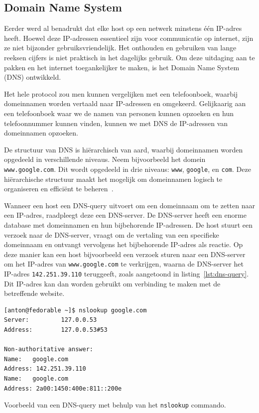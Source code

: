 \subsection{Domain Name System}
\label{netwerk_dns}

Eerder werd al benadrukt dat elke host op een netwerk minstens één IP-adres heeft.
Hoewel deze IP-adressen essentieel zijn voor communicatie op internet, zijn ze niet bijzonder gebruiksvriendelijk.
Het onthouden en gebruiken van lange reeksen cijfers is niet praktisch in het dagelijks gebruik.
Om deze uitdaging aan te pakken en het internet toegankelijker te maken, is het Domain Name System (DNS) ontwikkeld.

Het hele protocol zou men kunnen vergelijken met een telefoonboek, waarbij domeinnamen worden vertaald naar IP-adressen en omgekeerd.
Gelijkaarig aan een telefoonboek waar we de namen van personen kunnen opzoeken en hun telefoonnummer kunnen vinden, kunnen we met DNS de IP-adressen van domeinnamen opzoeken.

De structuur van DNS is hi\"erarchisch van aard, waarbij domeinnamen worden opgedeeld in verschillende niveaus.
Neem bijvoorbeeld het domein \texttt{www.google.com}. Dit wordt opgedeeld in drie niveaus: \texttt{www}, \texttt{google}, en \texttt{com}.
Deze hi\"erarchische structuur maakt het mogelijk om domeinnamen logisch te organiseren en effici\"ent te beheren~\autocite{dordal2020}.

Wanneer een host een DNS-query uitvoert om een domeinnaam om te zetten naar een IP-adres, raadpleegt deze een DNS-server.
De DNS-server heeft een enorme database met domeinnamen en hun bijbehorende IP-adressen.
De host stuurt een verzoek naar de DNS-server, vraagt om de vertaling van een specifieke domeinnaam en ontvangt vervolgens het bijbehorende IP-adres als reactie.
Op deze manier kan een host bijvoorbeeld een verzoek sturen naar een DNS-server om het IP-adres van \texttt{www.google.com} te verkrijgen, waarna de DNS-server het IP-adres \texttt{142.251.39.110} teruggeeft, zoals aangetoond in listing~\ref{lst:dns-query}.
Dit IP-adres kan dan worden gebruikt om verbinding te maken met de betreffende website.

\begin{listing}
  \begin{verbatim}
[anton@fedorable ~]$ nslookup google.com
Server:         127.0.0.53
Address:        127.0.0.53#53

Non-authoritative answer:
Name:   google.com
Address: 142.251.39.110
Name:   google.com
Address: 2a00:1450:400e:811::200e
  \end{verbatim}
  \caption{Voorbeeld van een DNS-query met behulp van het \texttt{nslookup} commando.}
  \label{lst:dns-query}
\end{listing}
